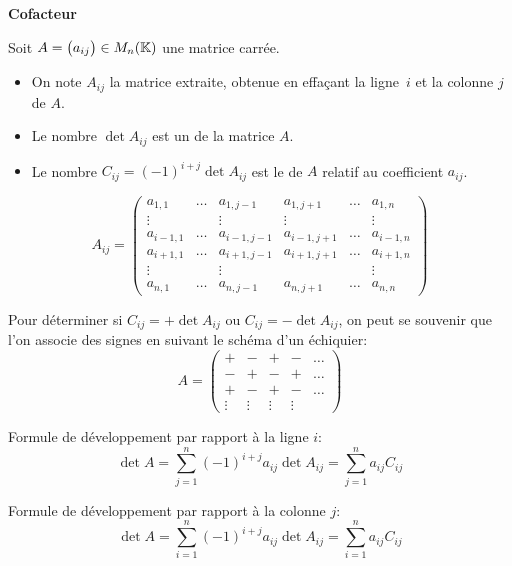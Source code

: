 \documentclass[10pt,class=article,crop=false]{standalone}
\begin{document}
\begin{multicols}{2}
\textbf{Cofacteur}

	Soit $A = \big( a_{ij}\big) \in M_n(\mathbb{K})$ une matrice carrée.
	
	\begin{itemize}
		\item On note $A_{ij}$ la matrice extraite, obtenue en effaçant la ligne~$i$ et la colonne $j$ de $A$.
		\item Le nombre $\det A_{ij}$ est un  de la matrice $A$.
		\item Le nombre $C_{ij} = (-1)^{i+j}\det A_{ij}$ est le  de $A$
		relatif au coefficient $a_{ij}$.
	\end{itemize}


\[
A_{ij} = \begin{pmatrix}
	a_{1,1} & \dots & a_{1,j-1} & a_{1,j+1} &\dots & a_{1,n}\\
	\vdots &&\vdots &\vdots &&\vdots \\
	a_{i-1,1} & \dots & a_{i-1,j-1} & a_{i-1,j+1} &\dots & a_{i-1,n}\\
	a_{i+1,1} & \dots & a_{i+1,j-1} & a_{i+1,j+1} &\dots & a_{i+1,n}\\
	\vdots &&\vdots &&&\vdots \\
	a_{n,1} & \dots & a_{n,j-1} & a_{n,j+1}& \dots & a_{n,n}
\end{pmatrix}
\]



Pour déterminer si $C_{ij} = +\det A_{ij} $ ou $C_{ij} = -\det A_{ij}$, on peut se souvenir
que l'on associe des signes en suivant le schéma d'un échiquier:
$$  A =
\begin{pmatrix}
	+ & - & + & - &\dots\\
	- & + & - & + &\dots \\
	+ & - & + & - &\dots\\
	\vdots & \vdots & \vdots & \vdots &
\end{pmatrix}
$$

\begin{theoreme}
	Formule de développement par rapport à la ligne $i$:
	$$\det A
	= \sum_{j=1}^n (-1)^{i+j} a_{ij} \det A_{ij}
	= \sum_{j=1}^n a_{ij} C_{ij}$$
	
	Formule de développement par rapport à la colonne $j$:
	$$\det A
	= \sum_{i=1}^n (-1)^{i+j} a_{ij} \det A_{ij}
	= \sum_{i=1}^n a_{ij}C_{ij}$$
\end{theoreme}


\end{multicols}
\end{document}
